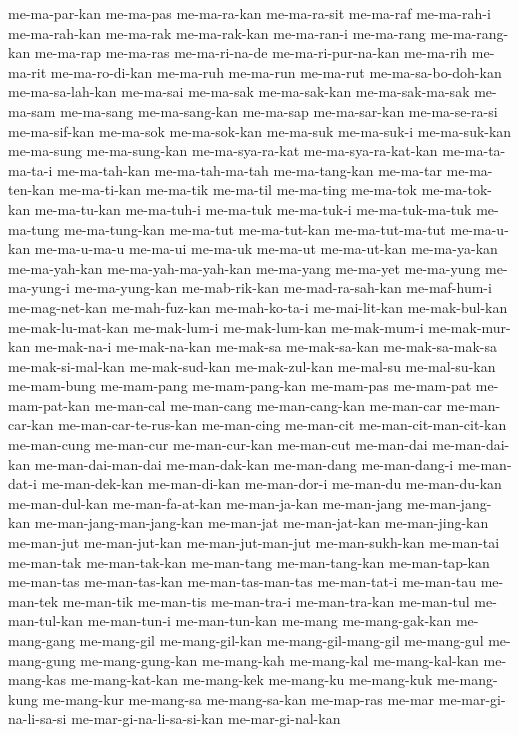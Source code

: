 {me-ma-par-kan me-ma-pas me-ma-ra-kan me-ma-ra-sit me-ma-raf me-ma-rah-i
me-ma-rah-kan me-ma-rak me-ma-rak-kan me-ma-ran-i me-ma-rang
me-ma-rang-kan me-ma-rap me-ma-ras me-ma-ri-na-de me-ma-ri-pur-na-kan
me-ma-rih me-ma-rit me-ma-ro-di-kan me-ma-ruh me-ma-run me-ma-rut
me-ma-sa-bo-doh-kan me-ma-sa-lah-kan me-ma-sai me-ma-sak me-ma-sak-kan
me-ma-sak-ma-sak me-ma-sam me-ma-sang me-ma-sang-kan me-ma-sap
me-ma-sar-kan me-ma-se-ra-si me-ma-sif-kan me-ma-sok me-ma-sok-kan
me-ma-suk me-ma-suk-i me-ma-suk-kan me-ma-sung me-ma-sung-kan
me-ma-sya-ra-kat me-ma-sya-ra-kat-kan me-ma-ta-ma-ta-i me-ma-tah-kan
me-ma-tah-ma-tah me-ma-tang-kan me-ma-tar me-ma-ten-kan me-ma-ti-kan
me-ma-tik me-ma-til me-ma-ting me-ma-tok me-ma-tok-kan me-ma-tu-kan
me-ma-tuh-i me-ma-tuk me-ma-tuk-i me-ma-tuk-ma-tuk me-ma-tung
me-ma-tung-kan me-ma-tut me-ma-tut-kan me-ma-tut-ma-tut me-ma-u-kan
me-ma-u-ma-u me-ma-ui me-ma-uk me-ma-ut me-ma-ut-kan me-ma-ya-kan
me-ma-yah-kan me-ma-yah-ma-yah-kan me-ma-yang me-ma-yet me-ma-yung
me-ma-yung-i me-ma-yung-kan me-mab-rik-kan me-mad-ra-sah-kan me-maf-hum-i
me-mag-net-kan me-mah-fuz-kan me-mah-ko-ta-i me-mai-lit-kan me-mak-bul-kan
me-mak-lu-mat-kan me-mak-lum-i me-mak-lum-kan me-mak-mum-i me-mak-mur-kan
me-mak-na-i me-mak-na-kan me-mak-sa me-mak-sa-kan me-mak-sa-mak-sa
me-mak-si-mal-kan me-mak-sud-kan me-mak-zul-kan me-mal-su me-mal-su-kan
me-mam-bung me-mam-pang me-mam-pang-kan me-mam-pas me-mam-pat
me-mam-pat-kan me-man-cal me-man-cang me-man-cang-kan me-man-car
me-man-car-kan me-man-car-te-rus-kan me-man-cing me-man-cit
me-man-cit-man-cit-kan me-man-cung me-man-cur me-man-cur-kan me-man-cut
me-man-dai me-man-dai-kan me-man-dai-man-dai me-man-dak-kan me-man-dang
me-man-dang-i me-man-dat-i me-man-dek-kan me-man-di-kan me-man-dor-i
me-man-du me-man-du-kan me-man-dul-kan me-man-fa-at-kan me-man-ja-kan
me-man-jang me-man-jang-kan me-man-jang-man-jang-kan me-man-jat
me-man-jat-kan me-man-jing-kan me-man-jut me-man-jut-kan
me-man-jut-man-jut me-man-sukh-kan me-man-tai me-man-tak me-man-tak-kan
me-man-tang me-man-tang-kan me-man-tap-kan me-man-tas me-man-tas-kan
me-man-tas-man-tas me-man-tat-i me-man-tau me-man-tek me-man-tik
me-man-tis me-man-tra-i me-man-tra-kan me-man-tul me-man-tul-kan
me-man-tun-i me-man-tun-kan me-mang me-mang-gak-kan me-mang-gang
me-mang-gil me-mang-gil-kan me-mang-gil-mang-gil me-mang-gul me-mang-gung
me-mang-gung-kan me-mang-kah me-mang-kal me-mang-kal-kan me-mang-kas
me-mang-kat-kan me-mang-kek me-mang-ku me-mang-kuk me-mang-kung
me-mang-kur me-mang-sa me-mang-sa-kan me-map-ras me-mar
me-mar-gi-na-li-sa-si me-mar-gi-na-li-sa-si-kan me-mar-gi-nal-kan
}
